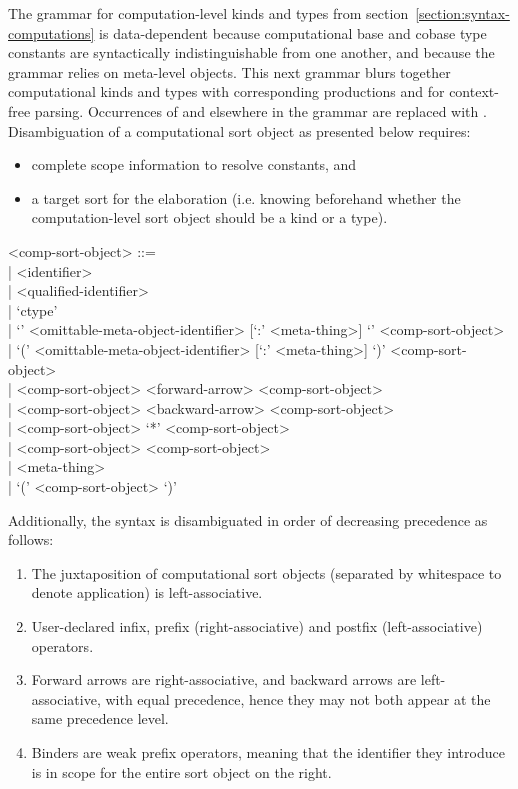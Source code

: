 \documentclass[11pt]{article}
\begin{document}
The grammar for computation-level kinds and types from section~\ref{section:syntax-computations} is data-dependent because computational base and cobase type constants are syntactically indistinguishable from one another, and because the grammar relies on meta-level objects.
This next grammar blurs together computational kinds and types with corresponding productions  and  for context-free parsing.
Occurrences of  and  elsewhere in the grammar are replaced with .
Disambiguation of a computational sort object as presented below requires:
\begin{itemize}
\item complete scope information to resolve constants, and
\item a target sort for the elaboration (i.e. knowing beforehand whether the computation-level sort object should be a kind or a type).
\end{itemize}

\begin{grammar}
<comp-sort-object> ::= \hfill\\
| <identifier>\\
| <qualified-identifier>\\
| `ctype'\\
| `{' <omittable-meta-object-identifier> [`:' <meta-thing>] `}' <comp-sort-object>\\
| `(' <omittable-meta-object-identifier> [`:' <meta-thing>] `)' <comp-sort-object>\\
| <comp-sort-object> <forward-arrow> <comp-sort-object>\\
| <comp-sort-object> <backward-arrow> <comp-sort-object>\\
| <comp-sort-object> `*' <comp-sort-object>\\
| <comp-sort-object> <comp-sort-object>\\
| <meta-thing>\\
| `(' <comp-sort-object> `)'
\end{grammar}

Additionally, the syntax is disambiguated in order of decreasing precedence as follows:

\begin{enumerate}
\item The juxtaposition of computational sort objects (separated by whitespace to denote application) is left-associative.
\item User-declared infix, prefix (right-associative) and postfix (left-associative) operators.
\item Forward arrows are right-associative, and backward arrows are left-associative, with equal precedence, hence they may not both appear at the same precedence level.
\item Binders are weak prefix operators, meaning that the identifier they introduce is in scope for the entire sort object on the right.
\end{enumerate}
\end{document}
